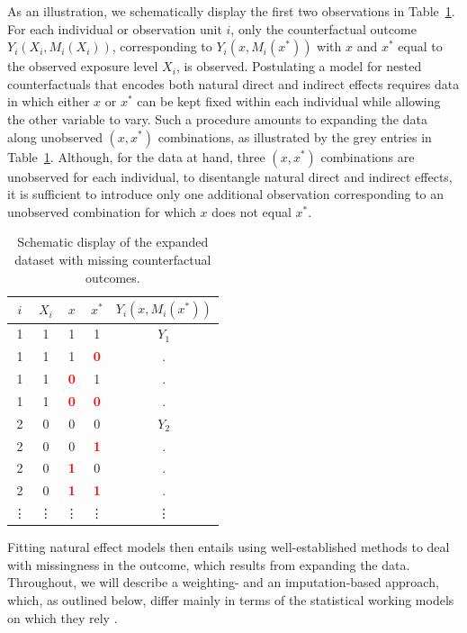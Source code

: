 \documentclass[nojss]{jss}
\begin{document}
\par As an illustration, we schematically display the first two observations in Table~\ref{tab-exp1}. For each individual or observation unit $i$, only the counterfactual outcome $Y_i(X_i,M_i(X_i))$, corresponding to $Y_i(x,M_i(x^*))$ with $x$ and $x^*$ equal to the observed exposure level $X_i$, is observed. Postulating a model for nested counterfactuals that encodes both natural direct and indirect effects requires data in which either $x$ or $x^*$ can be kept fixed within each individual while allowing the other variable to vary. Such a procedure amounts to expanding the data along unobserved $(x, x^*)$ combinations, as illustrated by the grey entries in Table~\ref{tab-exp1}. Although, for the data at hand, three $(x, x^*)$ combinations are unobserved for each individual, to disentangle natural direct and indirect effects, it is sufficient to introduce only one additional observation corresponding to an unobserved combination for which $x$ does not equal $x^*$.
\begin{table}[h]
\centering
\begin{tabular}{ccccc}
\toprule
$i$ & $X_i$ & $x$ & $x^*$ & $Y_i(x,M_i(x^*))$\\
\midrule
1 & 1 & 1 & 1 & $Y_1$\\
\rowcolor[gray]{.9}
1 & 1 & 1 &  \textcolor{red}{\bf 0} & .\\
\rowcolor[gray]{.9}
1 & 1 & \textcolor{red}{\bf 0} & 1 & .\\
\rowcolor[gray]{.9}
1 & 1 & \textcolor{red}{\bf 0} &  \textcolor{red}{\bf 0} & .\\
2 & 0 & 0 & 0 & $Y_2$\\
\rowcolor[gray]{.9}
2 & 0 & 0 & \textcolor{red}{\bf 1} & .\\
\rowcolor[gray]{.9}
2 & 0 & \textcolor{red}{\bf 1} & 0 & .\\
\rowcolor[gray]{.9}
2 & 0 & \textcolor{red}{\bf 1} & \textcolor{red}{\bf 1} & .\\
\vdots & \vdots & \vdots & \vdots & \vdots\\
\bottomrule
\end{tabular}
\caption{Schematic display of the expanded dataset with missing counterfactual outcomes.}\label{tab-exp1}
\end{table}
\par Fitting natural effect models then entails using well-established methods to deal with missingness in the outcome, which results from expanding the data. Throughout, we will describe a weighting- and an imputation-based approach, which, as outlined below, differ mainly in terms of the statistical working models on which they rely \citep{Vansteelandt2012f}.
\end{document}
